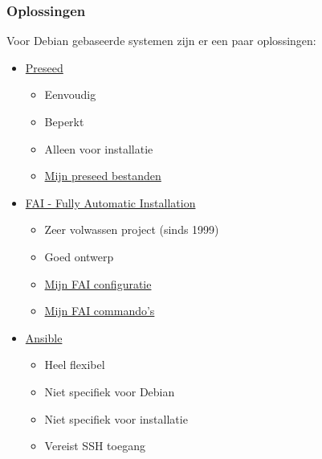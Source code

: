 \documentclass{beamer}
\newcommand{\myfaiconfig}{https://github.com/slspeek/fai}
\newcommand{\myfaicmds}{https://github.com/slspeek/fai-cmds}
\newcommand{\mypreseed}{https://slspeek.github.io/debian/}
\begin{document}
\begin{frame}
\frametitle{Oplossingen}
Voor Debian gebaseerde systemen zijn er een paar oplossingen:
\begin{itemize}
  \item \href{https://wiki.debian.org/DebianInstaller/Preseed}{Preseed} 
  \begin{itemize}
    \item Eenvoudig
    \item Beperkt
    \item Alleen voor installatie
    \item \href{\mypreseed}{Mijn preseed bestanden}
  \end{itemize}
  \item \href{https://fai-project.org/}{FAI - Fully Automatic Installation}
  \begin{itemize}
     \item Zeer volwassen project (sinds 1999)
     \item Goed ontwerp
     \item \href{\myfaiconfig}{Mijn FAI configuratie}
     \item \href{\myfaicmds}{Mijn FAI commando's} 
  \end{itemize}
  \item \href{https://ansible.com/}{Ansible}
  \begin{itemize}
     \item Heel flexibel
     \item Niet specifiek voor Debian
     \item Niet specifiek voor installatie
     \item Vereist SSH toegang
  \end{itemize}
\end{itemize}
\end{frame}
\end{document}
